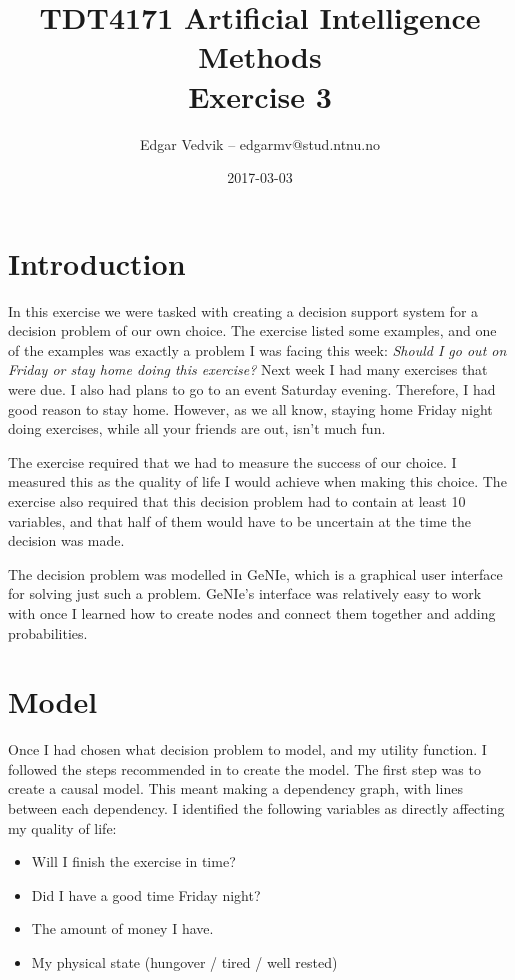 \documentclass{article}
\title{TDT4171 Artificial Intelligence Methods\\ Exercise 3}
\author{Edgar Vedvik -- edgarmv@stud.ntnu.no}
\date{2017-03-03}
\begin{document}
\maketitle


\section*{Introduction}
    In this exercise we were tasked with creating a decision support system for
    a decision problem of our own choice. The exercise listed some examples,
    and one of the examples was exactly a problem I was facing this week:
    \emph{Should I go out on Friday or stay home doing this exercise?} Next week
    I had many exercises that were due. I also had plans to go to an event
    Saturday evening. Therefore, I had good reason to stay home. However, as
    we all know, staying home Friday night doing exercises, while all your
    friends are out, isn't much fun.
    
    The exercise required that we had to measure the success of our choice. I
    measured this as the quality of life I would achieve when making this
    choice. The exercise also required that this decision problem had to
    contain at least 10 variables, and that half of them would have to be
    uncertain at the time the decision was made.

    The decision problem was modelled in GeNIe, which is a graphical user
    interface for solving just such a problem. GeNIe's interface was relatively
    easy to work with once I learned how to create nodes and connect them
    together and adding probabilities.

\section*{Model}

    Once I had chosen what decision problem to model, and my utility function.
    I followed the steps recommended in  to create
    the model. The first step was to create a causal model. This meant making a
    dependency graph, with lines between each dependency. I identified the
    following variables as directly affecting my quality of life:
    \begin{itemize}
        \item Will I finish the exercise in time?
        \item Did I have a good time Friday night?
        \item The amount of money I have.
        \item My physical state (hungover / tired / well rested)
    \end{itemize}
\end{document}
